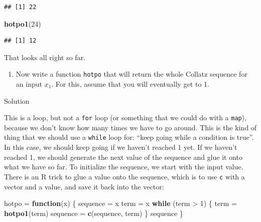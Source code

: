 \documentclass[]{tufte-book}
\newenvironment{Shaded}{}{}
\newcommand{\ControlFlowTok}[1]{\textcolor[rgb]{0.00,0.44,0.13}{\textbf{#1}}}
\newcommand{\DecValTok}[1]{\textcolor[rgb]{0.25,0.63,0.44}{#1}}
\newcommand{\KeywordTok}[1]{\textcolor[rgb]{0.00,0.44,0.13}{\textbf{#1}}}
\newcommand{\NormalTok}[1]{#1}
\newcommand{\OperatorTok}[1]{\textcolor[rgb]{0.40,0.40,0.40}{#1}}
\newcommand{\StringTok}[1]{\textcolor[rgb]{0.25,0.44,0.63}{#1}}
\providecommand{\tightlist}{%
  \setlength{\itemsep}{0pt}\setlength{\parskip}{0pt}}
\theoremstyle{definition}
\theoremstyle{definition}
\theoremstyle{definition}
\theoremstyle{remark}
\begin{document}
\begin{verbatim}
## [1] 22
\end{verbatim}

\begin{Shaded}
\begin{Highlighting}[]
\KeywordTok{hotpo1}\NormalTok{(}\DecValTok{24}\NormalTok{)}
\end{Highlighting}
\end{Shaded}

\begin{verbatim}
## [1] 12
\end{verbatim}

That looks all right so far.

\begin{enumerate}
\def\labelenumi{(\alph{enumi})}
\setcounter{enumi}{3}
\tightlist
\item
  Now write a function \texttt{hotpo} that will return the whole Collatz
  sequence for an input \(x_1\). For this, assume that you will
  eventually get to 1.
\end{enumerate}

Solution

This is a loop, but not a \texttt{for} loop (or something that we could
do with a \texttt{map}), because we don't know how many times we have to
go around. This is the kind of thing that we should use a \texttt{while}
loop for: ``keep going while a condition is true''. In this case, we
should keep going if we haven't reached 1 yet. If we haven't reached 1,
we should generate the next value of the sequence and glue it onto what
we have so far. To initialize the sequence, we start with the input
value. There is an R trick to glue a value onto the sequence, which is
to use \texttt{c} with a vector and a value, and save it back into the
vector:

\begin{Shaded}
\begin{Highlighting}[]
\NormalTok{hotpo =}\StringTok{ }\ControlFlowTok{function}\NormalTok{(x) \{}
\NormalTok{    sequence =}\StringTok{ }\NormalTok{x}
\NormalTok{    term =}\StringTok{ }\NormalTok{x}
    \ControlFlowTok{while}\NormalTok{ (term }\OperatorTok{>}\StringTok{ }\DecValTok{1}\NormalTok{) \{}
\NormalTok{        term =}\StringTok{ }\KeywordTok{hotpo1}\NormalTok{(term)}
\NormalTok{        sequence =}\StringTok{ }\KeywordTok{c}\NormalTok{(sequence, term)}
\NormalTok{    \}}
\NormalTok{    sequence}
\NormalTok{\}}
\end{Highlighting}
\end{Shaded}
\end{document}
